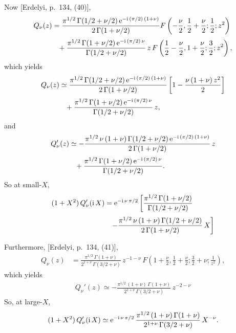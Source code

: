 \documentclass[12pt,prb,aps,notitlepage]{revtex4-1}
\begin{document}
Now [Erdelyi, p.~134, (40)],
\begin{align}
Q_\nu(z)&= \frac{\pi^{1/2}\,\Gamma(1/2+\nu/2)\,{\rm e}^{-{\rm i}\,(\pi/2)\,(1+\nu)}}{2\,\Gamma(1+\nu/2)}F\left(-\frac{\nu}{2},\frac{1}{2}+\frac{\nu}{2};\frac{1}{2};z^2\right)\nonumber\\[0.5ex]
&\phantom{=}+\frac{\pi^{1/2}\,\Gamma(1+\nu/2)\,{\rm e}^{-{\rm i}\,(\pi/2)\,\nu}}{\Gamma(1/2+\nu/2)}\,z\,F\left(\frac{1}{2}-\frac{\nu}{2},1+\frac{\nu}{2};\frac{3}{2};z^2\right),
\end{align}
which yields
\begin{align}
Q_\nu(z)&\simeq \frac{\pi^{1/2}\,\Gamma(1/2+\nu/2)\,{\rm e}^{-{\rm i}\,(\pi/2)\,(1+\nu)}}{2\,\Gamma(1+\nu/2)}\left[1-\frac{\nu\,(1+\nu)\,z^2}{2}\right]\nonumber\\[0.5ex]
&\phantom{=}+\frac{\pi^{1/2}\,\Gamma(1+\nu/2)\,{\rm e}^{-{\rm i}\,(\pi/2)\,\nu}}{\Gamma(1/2+\nu/2)}\,z,
\end{align}
and
\begin{align}
Q_\nu'(z)&\simeq- \frac{\pi^{1/2}\,\nu\,(1+\nu)\,\Gamma(1/2+\nu/2)\,{\rm e}^{-{\rm i}\,(\pi/2)\,(1+\nu)}}{2\,\Gamma(1+\nu/2)}\,z\nonumber\\[0.5ex]
&\phantom{=}+\frac{\pi^{1/2}\,\Gamma(1+\nu/2)\,{\rm e}^{-{\rm i}\,(\pi/2)\,\nu}}{\Gamma(1/2+\nu/2)}.
\end{align}
So at small-$X$, 
\begin{align}\label{e52}
(1+X^2)\,Q_\nu'({\rm i}\,X)&= {\rm e}^{-{\rm i}\,\nu\,\pi/2}\left[\frac{\pi^{1/2}\,\Gamma(1+\nu/2)}{\Gamma(1/2+\nu/2)}\right.\nonumber\\[0.5ex]
&\phantom{=}\left.-
\frac{\pi^{1/2}\,\nu\,(1+\nu)\,\Gamma(1/2+\nu/2)}{2\,\Gamma(1+\nu/2)}\,X\right]
\end{align}

Furthermore, [Erdelyi, p.~134, (41)],
\begin{align}
Q_{\nu}(z) &= \frac{\pi^{1/2}\,{\Gamma}(1+\nu)}{2^{1+\nu}\,\Gamma(3/2+\nu)}\,z^{-1-\nu}\,F\left(1+\frac{\nu}{2},\frac{1}{2}+\frac{\nu}{2};\frac{3}{2}+\nu;\frac{1}{z^2}\right),
\end{align}
which yields
\begin{align}
Q_{\nu}'(z)\simeq -\frac{\pi^{1/2}\,(1+\nu)\,{\Gamma}(1+\nu)}{2^{1+\nu}\,\Gamma(3/2+\nu)}\,z^{-2-\nu}
\end{align}
So, at large-$X$, 
\begin{align}\label{e55}
(1+X^2)\,Q_\nu'({\rm i}\,X) \simeq {\rm e}^{-{\rm i}\,\nu\,\pi/2}\,\frac{\pi^{1/2}\,(1+\nu)\,\Gamma(1+\nu)}{2^{1+\nu}\,\Gamma(3/2+\nu)}\,X^{-\nu}.
\end{align}
\end{document}
